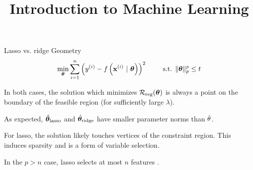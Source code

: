 \documentclass[11pt,compress,t,notes=noshow, xcolor=table]{beamer}
\title{Introduction to Machine Learning}
\begin{document}


\begin{vbframe}{Lasso vs. ridge Geometry}
$$ 
  \min_{\bm{\theta}} \sum\limits_{i=1}^n \left(y^{(i)} - f\left(\mathbf{x}^{(i)} ~|~ \bm{\theta}\right)\right)^2 \qquad \text{ s.t. } \|\bm{\theta}\|_p^p  \leq t 
$$ 
  \vspace{-0.5cm}
  \begin{figure}
    \centering
  \end{figure}

  \begin{itemize}
    \item \small{In both cases, the solution which minimizes $\mathcal{R}_{\text{reg}}(\bm{\theta})$ is always a point on the boundary of the feasible region (for sufficiently large $\lambda$).
    \item As expected, $\hat{\bm{\theta}}_{\text{lasso}}$ and $\hat{\bm{\theta}}_{\text{ridge}}$ have smaller parameter norms than $\hat{\theta}$.}
    \item For lasso, the solution likely touches vertices of the constraint region. This induces sparsity and is a form of variable selection.
    \item In the $p>n$ case, lasso selects at most $n$ features .
    
  \end{itemize}
  
\end{vbframe}
\end{document}
